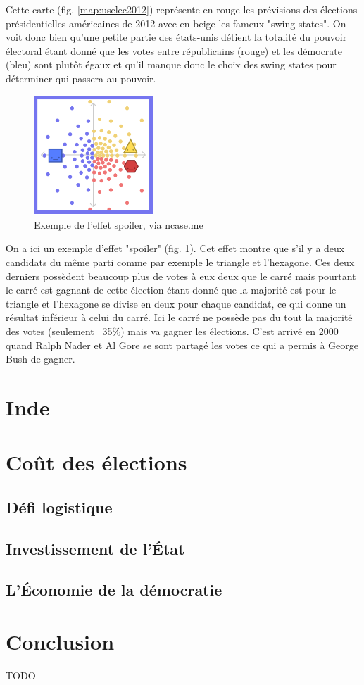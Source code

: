 \documentclass[12pt,a4paper]{report}
\begin{document}
Cette carte (fig. \ref{map:uselec2012}) représente en rouge les prévisions des élections présidentielles américaines de 2012 avec en beige les fameux "swing states".
On voit donc bien qu'une petite partie des états-unis détient la totalité du pouvoir électoral étant donné que les votes entre républicains (rouge) et les démocrate (bleu) sont plutôt égaux et qu'il manque donc le choix des swing states pour déterminer qui passera au pouvoir.

\begin{figure}[h]
	\centering
	\includegraphics[width=0.4\textwidth]{./images/spoiler-effect.png}
	\caption{Exemple de l'effet spoiler, via ncase.me \cite{ncase:ballot}}
	\label{sim:spoilereffect}
\end{figure}


On a ici un exemple d'effet "spoiler" (fig. \ref{sim:spoilereffect}).
Cet effet montre que s'il y a deux candidats du même parti comme par exemple le triangle et l'hexagone.
Ces deux derniers possèdent beaucoup plus de votes à eux deux que le carré mais pourtant le carré est gagnant de cette élection étant donné que la majorité est pour le triangle et l'hexagone se divise en deux pour chaque candidat, ce qui donne un résultat inférieur à celui du carré.
Ici le carré ne possède pas du tout la majorité des votes (seulement ~35\%) mais va gagner les élections.
C'est arrivé en 2000 quand Ralph Nader et Al Gore se sont partagé les votes ce qui a permis à George Bush de gagner.


\section{Inde} %

\section{Coût des élections}

\subsection{Défi logistique}
\subsection{Investissement de l'État}
\subsection{L'Économie de la démocratie}


\newpage
\section*{Conclusion}
TODO

 

\end{document}
